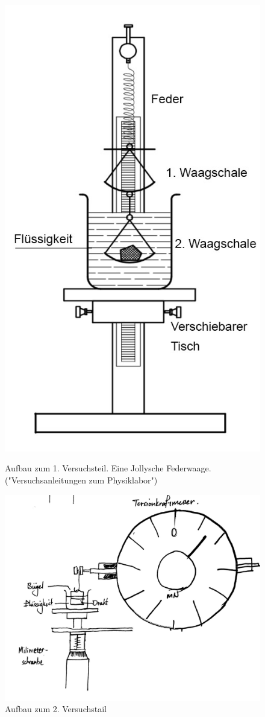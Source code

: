 \documentclass[11pt,a4paper]{article} %
\begin{document}
\begin{figure}
	\centering
	\includegraphics[scale=0.5]{Abb1}
	\caption{Aufbau zum 1. Versuchsteil. Eine Jollysche Federwaage. ("Versuchsanleitungen zum Physiklabor")}
	
	\includegraphics[scale=0.15]{Abb2}
	\caption{Aufbau zum 2. Versuchstail}
\end{figure}
\end{document}
